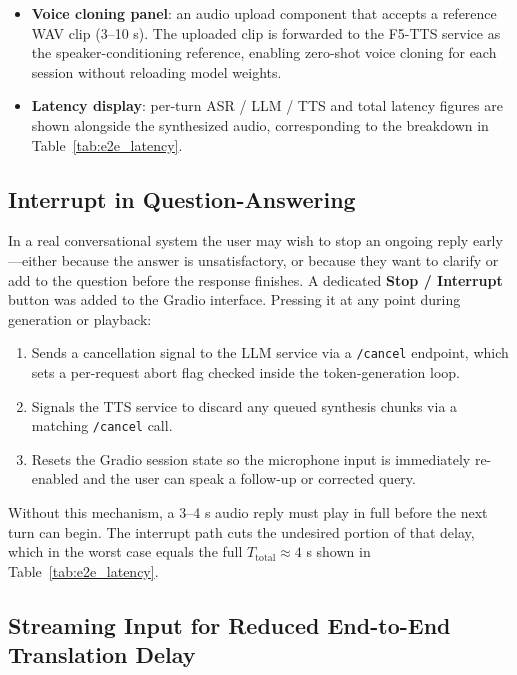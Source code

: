 \documentclass[12pt, a4paper]{article}
\begin{document}
\begin{itemize}
    \item \textbf{Voice cloning panel}: an audio upload component that accepts a reference WAV clip (3--10 s). The uploaded clip is forwarded to the F5-TTS service as the speaker-conditioning reference, enabling zero-shot voice cloning for each session without reloading model weights.
    \item \textbf{Latency display}: per-turn ASR / LLM / TTS and total latency figures are shown alongside the synthesized audio, corresponding to the breakdown in Table~\ref{tab:e2e_latency}.
\end{itemize}

\subsection{Interrupt in Question-Answering}

In a real conversational system the user may wish to stop an ongoing reply early---either because the answer is unsatisfactory, or because they want to clarify or add to the question before the response finishes. A dedicated \textbf{Stop / Interrupt} button was added to the Gradio interface. Pressing it at any point during generation or playback:

\begin{enumerate}
    \item Sends a cancellation signal to the LLM service via a \texttt{/cancel} endpoint, which sets a per-request abort flag checked inside the token-generation loop.
    \item Signals the TTS service to discard any queued synthesis chunks via a matching \texttt{/cancel} call.
    \item Resets the Gradio session state so the microphone input is immediately re-enabled and the user can speak a follow-up or corrected query.
\end{enumerate}

Without this mechanism, a 3--4 s audio reply must play in full before the next turn can begin. The interrupt path cuts the undesired portion of that delay, which in the worst case equals the full $T_{\text{total}} \approx 4$ s shown in Table~\ref{tab:e2e_latency}.

\subsection{Streaming Input for Reduced End-to-End Translation Delay}
\end{document}
